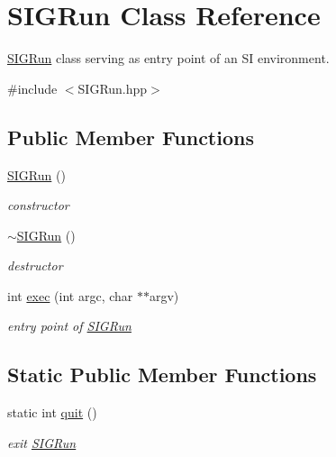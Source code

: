 \hypertarget{class_s_i_g_run}{}\section{S\+I\+G\+Run Class Reference}
\label{class_s_i_g_run}


\mbox{\hyperlink{class_s_i_g_run}{S\+I\+G\+Run}} class serving as entry point of an SI environment.  




{\ttfamily \#include $<$S\+I\+G\+Run.\+hpp$>$}

\subsection*{Public Member Functions}
\begin{DoxyCompactItemize}
\item 
\mbox{\hyperlink{class_s_i_g_run_a42faa5a4dd64664d6bdce6c94f5adc1d}{S\+I\+G\+Run}} ()
\begin{DoxyCompactList}\small\item\em constructor \end{DoxyCompactList}\item 
\mbox{\hyperlink{class_s_i_g_run_addf9aae6daca50376eeed2b1c73e5a07}{$\sim$\+S\+I\+G\+Run}} ()
\begin{DoxyCompactList}\small\item\em destructor \end{DoxyCompactList}\item 
int \mbox{\hyperlink{class_s_i_g_run_a26887ac64836e80c0b7eaaaeff0f6d14}{exec}} (int argc, char $\ast$$\ast$argv)
\begin{DoxyCompactList}\small\item\em entry point of \mbox{\hyperlink{class_s_i_g_run}{S\+I\+G\+Run}} \end{DoxyCompactList}\end{DoxyCompactItemize}
\subsection*{Static Public Member Functions}
\begin{DoxyCompactItemize}
\item 
static int \mbox{\hyperlink{class_s_i_g_run_ab650777985ff7f5784bf59f1cdf370f5}{quit}} ()
\begin{DoxyCompactList}\small\item\em exit \mbox{\hyperlink{class_s_i_g_run}{S\+I\+G\+Run}} \end{DoxyCompactList}\end{DoxyCompactItemize}


